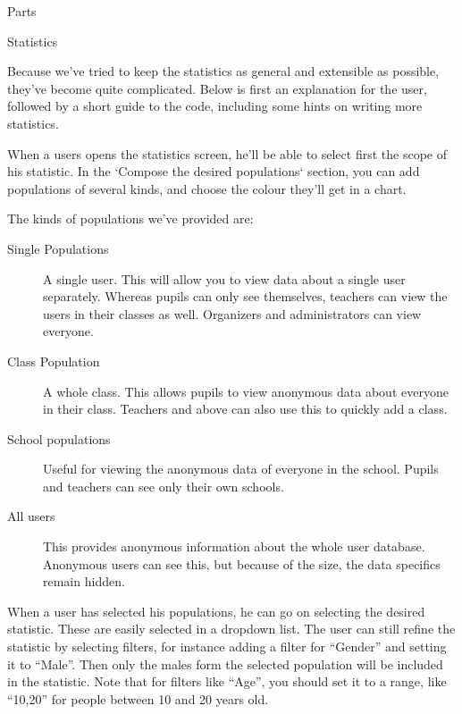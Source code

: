 \documentclass[]{article}
\begin{document}
\begin{section}{Parts}
    \begin{subsection}{Statistics}

        Because we've tried to keep the statistics as general and extensible as
        possible, they've become quite complicated. Below is first an
        explanation for the user, followed by a short guide to the code,
        including some hints on writing more statistics.

        When a users opens the statistics screen, he'll be able to select first
        the scope of his statistic. In the `Compose the desired populations`
        section, you can add populations of several kinds, and choose the colour
        they'll get in a chart.

        The kinds of populations we've provided are:
        \begin{description}
            \item[Single Populations] A single user. This will allow you to view
                data about a single user separately. Whereas pupils can only see
                themselves, teachers can view the users in their classes as
                well. Organizers and administrators can view everyone.
            \item[Class Population] A whole class. This allows pupils to view
                anonymous data about everyone in their class. Teachers and above
                can also use this to quickly add a class.
            \item[School populations] Useful for viewing the anonymous data of
                everyone in the school. Pupils and teachers can see only their
                own schools.
            \item[All users] This provides anonymous information about the whole
                user database. Anonymous users can see this, but because of the
                size, the data specifics remain hidden.
        \end{description}

        When a user has selected his populations, he can go on selecting the
        desired statistic. These are easily selected in a dropdown list. The
        user can still refine the statistic by selecting filters, for
        instance adding a filter for ``Gender'' and setting it to ``Male''. Then
        only the males form the selected population will be included in the
        statistic. Note that for filters like ``Age'', you should set it to a
        range, like ``10,20'' for people between 10 and 20 years old.


\end{subsection}
\end{section}
\end{document}
